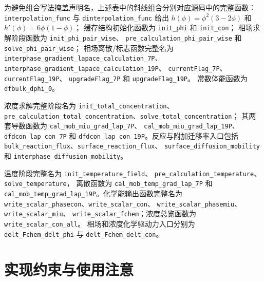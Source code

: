 \documentclass[UTF8,a4paper,11pt]{ctexart}
\newcommand{\code}[1]{\texttt{#1}}
\begin{document}
为避免组合写法掩盖声明名，上述表中的斜线组合分别对应源码中的完整函数：
\code{interpolation\_func} 与 \code{dinterpolation\_func} 给出
$h(\phi)=\phi^2(3-2\phi)$ 和 $h'(\phi)=6\phi(1-\phi)$；
缓存结构初始化函数为 \code{init\_phi} 和 \code{init\_con}；
相场求解阶段函数为 \code{init\_phi\_pair\_wise}、
\code{pre\_calculation\_phi\_pair\_wise} 和 \code{solve\_phi\_pair\_wise}；
相场离散/标志函数完整名为
\code{interphase\_gradient\_lapace\_calculation\_7P}、
\code{interphase\_gradient\_lapace\_calculation\_19P}、
\code{currentFlag\_7P}、\code{currentFlag\_19P}、
\code{upgradeFlag\_7P} 和 \code{upgradeFlag\_19P}。
常数体能函数为 \code{dfbulk\_dphi\_0}。

浓度求解完整阶段名为 \code{init\_total\_concentration}、
\code{pre\_calculation\_total\_concentration}、\code{solve\_total\_concentration}；
其两套导数函数为 \code{cal\_mob\_miu\_grad\_lap\_7P}、
\code{cal\_mob\_miu\_grad\_lap\_19P}、\code{dfdcon\_lap\_con\_7P} 和
\code{dfdcon\_lap\_con\_19P}。反应与附加迁移率入口包括
\code{bulk\_reaction\_flux}、\code{surface\_reaction\_flux}、
\code{surface\_diffusion\_mobility} 和 \code{interphase\_diffusion\_mobility}。

温度阶段完整名为 \code{init\_temperature\_field}、
\code{pre\_calculation\_temperature}、\code{solve\_temperature}，
离散函数为 \code{cal\_mob\_temp\_grad\_lap\_7P} 和
\code{cal\_mob\_temp\_grad\_lap\_19P}。化学能输出函数完整名为
\code{write\_scalar\_phasecon}、\code{write\_scalar\_con}、
\code{write\_scalar\_phasemiu}、\code{write\_scalar\_miu}、
\code{write\_scalar\_fchem}；浓度总览函数为 \code{write\_scalar\_con\_all}。
相场和浓度化学驱动力入口分别为 \code{delt\_Fchem\_delt\_phi} 与
\code{delt\_Fchem\_delt\_con}。

\section{实现约束与使用注意}
\end{document}
